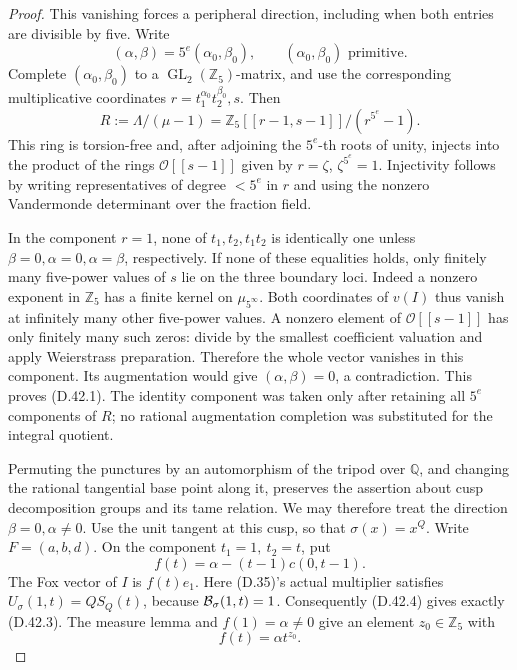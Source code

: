 \begin{proof}
This vanishing forces a peripheral direction,
including when both entries are divisible
by five. Write
\[
 (\alpha,\beta)=5^e(\alpha_0,\beta_0),
 \qquad(\alpha_0,\beta_0)\text{ primitive}.
\]
Complete \((\alpha_0,\beta_0)\) to a
\(\operatorname{GL}_2(\mathbb Z_5)\)-matrix,
and use the corresponding multiplicative
coordinates \(r=t_1^{\alpha_0}t_2^{\beta_0},s\).
Then
\[
 R:=\Lambda/(\mu-1)
   =\mathbb Z_5[[r-1,s-1]]/(r^{5^e}-1).
\]
This ring is torsion-free and, after adjoining
the \(5^e\)-th roots of unity, injects into
the product of the rings
\(\mathcal O[[s-1]]\) given by \(r=\zeta\),
\(\zeta^{5^e}=1\). Injectivity follows by
writing representatives of degree \(<5^e\)
in \(r\) and using the nonzero Vandermonde
determinant over the fraction field.

In the component \(r=1\), none of
\(t_1,t_2,t_1t_2\) is identically one unless
\(\beta=0,\alpha=0,\alpha=\beta\), respectively.
If none of these equalities holds, only
finitely many five-power values of \(s\)
lie on the three boundary loci. Indeed a
nonzero exponent in \(\mathbb Z_5\) has a
finite kernel on \(\mu_{5^\infty}\).
Both coordinates of \(v(I)\) thus vanish
at infinitely many other five-power values.
A nonzero element of \(\mathcal O[[s-1]]\)
has only finitely many such zeros:
divide by the smallest coefficient valuation
and apply Weierstrass preparation.
Therefore the whole vector vanishes in this
component. Its augmentation would give
\((\alpha,\beta)=0\), a contradiction.
This proves (D.42.1). The identity component
was taken only after retaining all
\(5^e\) components of \(R\); no rational
augmentation completion was substituted
for the integral quotient.

Permuting the punctures by an automorphism
of the tripod over \(\mathbb Q\), and changing
the rational tangential base point along it,
preserves the assertion about cusp decomposition
groups and its tame relation. We may therefore
treat the direction \(\beta=0,\alpha\ne0\).
Use the unit tangent at this cusp, so that
\(\sigma(x)=x^Q\). Write \(F=(a,b,d)\).
On the component \(t_1=1,\ t_2=t\), put
\[
                     f(t)=\alpha-(t-1)c(0,t-1).
\]
The Fox vector of \(I\) is \(f(t)e_1\).
Here (D.35)'s actual multiplier satisfies
\(U_\sigma(1,t)=Q S_Q(t)\), because
\({\cal B}_\sigma(1,t)=1\). Consequently
(D.42.4) gives exactly (D.42.3).
The measure lemma and \(f(1)=\alpha\ne0\)
give an element \(z_0\in\mathbb Z_5\) with
\[
                          f(t)=\alpha t^{z_0}.          \tag{D.42.5}
\]


\end{proof}
